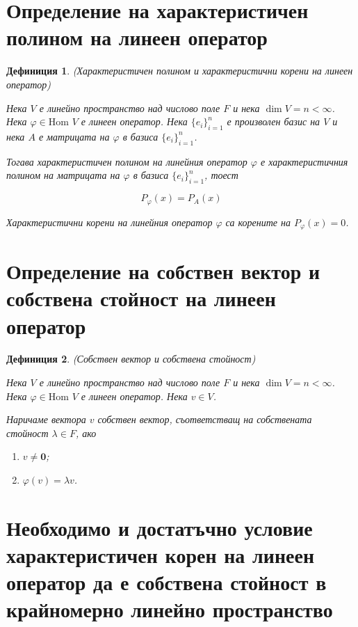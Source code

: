 \documentclass{scrartcl}
\newtheorem{definition}{Дефиниция}
\begin{document}
\begin{FlushLeft}
\section{Определение на характеристичен полином на линеен оператор}

\begin{definition}
(Характеристичен полином и характеристични корени на линеен оператор)

Нека $V$ е линейно пространство над числово поле $F$ и нека $\dim V = n < \infty$.
Нека $\varphi \in \text{Hom }{V}$ е линеен оператор.
Нека $\{e_i\}_{i=1}^n$ е произволен базис на $V$ и нека $A$ е матрицата на $\varphi$ в базиса $\{e_i\}_{i=1}^n$.

Тогава характеристичен полином на линейния оператор $\varphi$ е характеристичния полином на матрицата на $\varphi$ в базиса $\{e_i\}_{i=1}^n$, тоест

$$P_{\varphi}(x) = P_A(x)$$

Характеристични корени на линейния оператор $\varphi$ са корените на $P_{\varphi}(x) = 0$.
\end{definition}

\section{Определение на
собствен вектор и собствена стойност на линеен оператор}

\begin{definition}
(Собствен вектор и собствена стойност)

Нека $V$ е линейно пространство над числово поле $F$ и нека $\dim V = n < \infty$.
Нека $\varphi \in \text{Hom }{V}$ е линеен оператор.
Нека $v\in V$.

Наричаме вектора $v$ собствен вектор, съответстващ на собствената стойност $\lambda \in F$, ако

\begin{enumerate}
    \item $v \ne \mathbf{0}$;
    \item $\varphi(v) = \lambda v$.
\end{enumerate}
\end{definition}

\section{Необходимо и достатъчно
условие характеристичен корен на линеен оператор да е собствена стойност в
крайномерно линейно пространство}


\end{FlushLeft}
\end{document}
